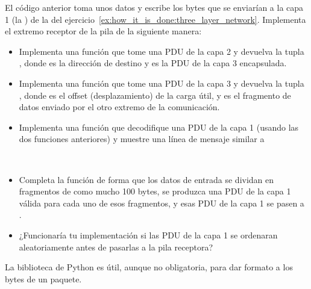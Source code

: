 \begin{center}
\end{center}

\begin{exercise}
El código anterior toma unos datos y escribe los bytes que se enviarían a la capa 1
(la ) de la  del ejercicio~\ref{ex:how_it_is_done:three_layer_network}.
Implementa el extremo receptor de la pila de la siguiente manera:

\begin{itemize}
\item Implementa una función  que tome una PDU de la capa 2
  y devuelva la tupla , donde  es la dirección de destino y
   es la PDU de la capa 3 encapsulada.\\[-0.25cm]
  
\item Implementa una función  que tome una PDU de la capa 3
  y devuelva la tupla , donde  es el offset (desplazamiento) de la carga útil, y
   es el fragmento de datos enviado por el otro extremo de la comunicación.\\[-0.25cm]
  
\item Implementa una función  que decodifique una PDU de la capa 1 (usando las dos funciones anteriores)
  y muestre una línea de mensaje similar a
  \begin{center}
  \end{center}\ \\[-0.75cm]
  
\item Completa la función  de forma que los datos de entrada se dividan en fragmentos de como mucho 100 bytes,
      se produzca una PDU de la capa 1 válida para cada uno de esos fragmentos,
      y esas PDU de la capa 1 se pasen a .\\[-0.25cm]
      
\item ¿Funcionaría tu implementación si las PDU de la capa 1 se ordenaran aleatoriamente antes de pasarlas a la pila receptora?
\end{itemize}
% 
\label{ex:how_it_is_done:implementation_three_layer_network}
\end{exercise}

\begin{remark}
La biblioteca  de Python es útil, aunque no obligatoria, para dar formato a los bytes de un paquete.
\end{remark}

